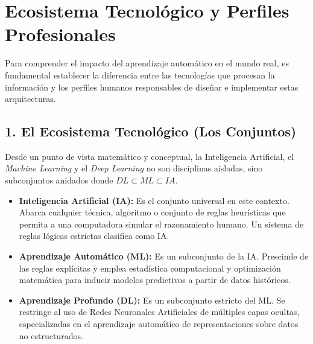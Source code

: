 \section{Ecosistema Tecnológico y Perfiles Profesionales}

Para comprender el impacto del aprendizaje automático en el mundo real, es fundamental establecer la diferencia entre las tecnologías que procesan la información y los perfiles humanos responsables de diseñar e implementar estas arquitecturas.

\subsection{1. El Ecosistema Tecnológico (Los Conjuntos)}
Desde un punto de vista matemático y conceptual, la Inteligencia Artificial, el \textit{Machine Learning} y el \textit{Deep Learning} no son disciplinas aisladas, sino subconjuntos anidados donde $DL \subset ML \subset IA$.

\begin{itemize}
    \item \textbf{Inteligencia Artificial (IA):} Es el conjunto universal en este contexto. Abarca cualquier técnica, algoritmo o conjunto de reglas heurísticas que permita a una computadora simular el razonamiento humano. Un sistema de reglas lógicas estrictas clasifica como IA.
    \item \textbf{Aprendizaje Automático (ML):} Es un subconjunto de la IA. Prescinde de las reglas explícitas y emplea estadística computacional y optimización matemática para inducir modelos predictivos a partir de datos históricos.
    \item \textbf{Aprendizaje Profundo (DL):} Es un subconjunto estricto del ML. Se restringe al uso de Redes Neuronales Artificiales de múltiples capas ocultas, especializadas en el aprendizaje automático de representaciones sobre datos no estructurados.
\end{itemize}

